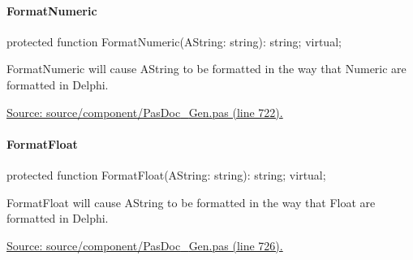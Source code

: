 \documentclass{report}
\newif\ifpdf
\begin{document}
\paragraph*{FormatNumeric}\hspace*{\fill}

\label{PasDoc_Gen.TDocGenerator-FormatNumeric}
\begin{list}{}{
\setlength{\itemindent}{0cm}
\setlength{\listparindent}{0cm}
\setlength{\leftmargin}{\evensidemargin}
\addtolength{\leftmargin}{\tmplength}
\settowidth{\labelsep}{X}
\addtolength{\leftmargin}{\labelsep}
\setlength{\labelwidth}{\tmplength}
}
\item[\textbf{Declaration}\hfill]
\ifpdf
\begin{flushleft}
\fi
\begin{ttfamily}
protected function FormatNumeric(AString: string): string; virtual;\end{ttfamily}

\ifpdf
\end{flushleft}
\fi

\par
\item[\textbf{Description}]
FormatNumeric will cause AString to be formatted in the way that Numeric are formatted in Delphi.\par
\href{https://github.com/pasdoc/pasdoc/blob/master/source/component/PasDoc_Gen.pas#L722}{Source: source/component/PasDoc{\_}Gen.pas (line 722).}

\end{list}
\paragraph*{FormatFloat}\hspace*{\fill}

\label{PasDoc_Gen.TDocGenerator-FormatFloat}
\begin{list}{}{
\setlength{\itemindent}{0cm}
\setlength{\listparindent}{0cm}
\setlength{\leftmargin}{\evensidemargin}
\addtolength{\leftmargin}{\tmplength}
\settowidth{\labelsep}{X}
\addtolength{\leftmargin}{\labelsep}
\setlength{\labelwidth}{\tmplength}
}
\item[\textbf{Declaration}\hfill]
\ifpdf
\begin{flushleft}
\fi
\begin{ttfamily}
protected function FormatFloat(AString: string): string; virtual;\end{ttfamily}

\ifpdf
\end{flushleft}
\fi

\par
\item[\textbf{Description}]
FormatFloat will cause AString to be formatted in the way that Float are formatted in Delphi.\par
\href{https://github.com/pasdoc/pasdoc/blob/master/source/component/PasDoc_Gen.pas#L726}{Source: source/component/PasDoc{\_}Gen.pas (line 726).}

\end{list}
\end{document}
